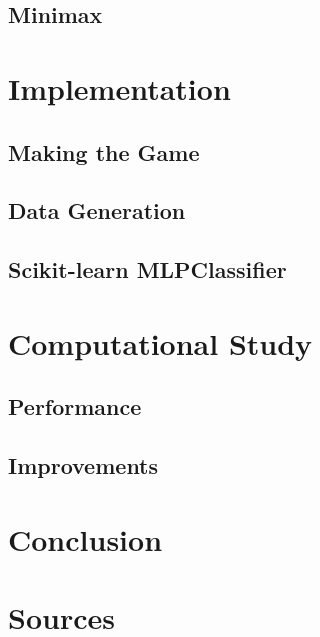 \documentclass[12pt]{article}
\begin{document}
\subsection{Minimax}

\section{Implementation}
\subsection{Making the Game}

\subsection{Data Generation}

\subsection{Scikit-learn MLPClassifier}

\section{Computational Study}
\subsection{Performance}

\subsection{Improvements}

\section{Conclusion}

\section{Sources}
\end{document}
